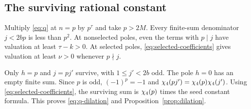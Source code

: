 \subsection{The surviving rational constant}

Multiply \eqref{eq:q} at $n=p$ by $p^\tau$ and take $p>2M$.
Every finite-sum denominator $j<2bp$ is less than $p^2$.
At nonselected poles, even the terms with $p\mid j$ have
valuation at least $\tau-k>0$.
At selected poles, \eqref{eq:selected-coefficients} gives valuation
at least $\nu>0$ whenever $p\nmid j$.

Only $h=p$ and $j=pj'$ survive, with $1\le j'<2b$ odd.
The pole $h=0$ has an empty finite sum. Since $p$ is odd,
$(-1)^p=-1$ and $\chi_4(pj')=\chi_4(p)\chi_4(j')$.
Using \eqref{eq:selected-coefficients}, the surviving sum is
$\chi_4(p)$ times the seed constant formula.
This proves \eqref{eq:q-dilation} and Proposition~\ref{prop:dilation}.
